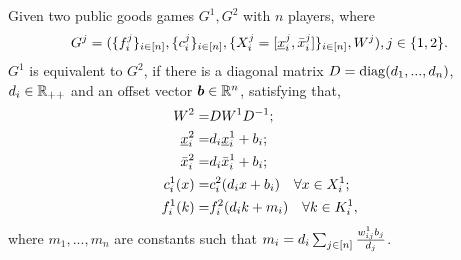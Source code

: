 \begin{definition}
\label{def:equivalence}
Given two public goods games $G^1, G^2$ with $n$ players, where 
\begin{align*}
    G^j = (\{f^j_i\}_{i\in[n]}, \{c^j_i\}_{i\in[n]}, \{X^j_i = [\underline{x}^j_i, \bar{x}^j_i]\}_{i\in[n]}, W^j), j \in \{1,2\}.
\end{align*}
$G^1$ is equivalent to $G^2$, if there is a diagonal matrix $D = \mathrm{diag}(d_1,...,d_n)$, $d_i\in \mathbb{R}_{++}$ and an offset vector $\bm{b} \in \mathbb{R}^n$, satisfying that, 
\begin{align*}
    W^2 =& D W^1 D^{-1};
    \\
    \underline{x}^2_i =& d_i \underline{x}^1_i + b_i;
    \\
    \bar{x}^2_i =& d_i \bar{x}^1_i + b_i;
    \\
    c^1_i(x) =& c^2_i(d_i x + b_i)\quad\forall x \in X^1_i;
    \\
    f^1_i(k) =& f^2_i(d_i k + m_i)\quad\forall k \in K^1_i,
\end{align*}
where $m_1,...,m_n$ are constants such that $m_i = d_i \sum_{j\in[n]} \frac{w^1_{ij} b_j}{d_j}$.

\end{definition}